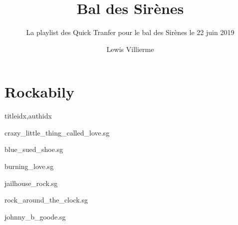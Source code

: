 \documentclass[
    ]{article}
\title{Bal des Sirènes}
\author{Lewis Villierme}
\subtitle{La playlist des Quick Tranfer pour le bal des Sirènes le 22 juin 2019}
\newcommand{\phantomsection}{}
\begin{document}
\maketitle



\ifdiagrampage
   \phantomsection
   \chords
\fi
\setcounter{songnum}{1}%

\phantomsection
{}


\section{Rockabily}

\begin{songs}{titleidx,authidx}

{crazy_little_thing_called_love.sg}


{blue_sued_shoe.sg}


{burning_love.sg}


{jailhouse_rock.sg}


{rock_around_the_clock.sg}


{johnny_b_goode.sg}

\end{songs}
\end{document}

